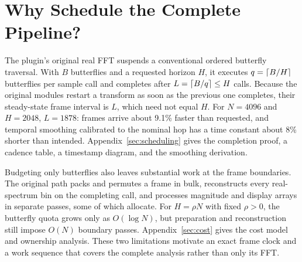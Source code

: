 \section{Why Schedule the Complete Pipeline?}
\label{sec:legacy-motivation}
The plugin's original real FFT suspends a conventional ordered butterfly
traversal. With $B$ butterflies and a requested horizon $H$, it executes
$q=\left\lceil B/H\right\rceil$ butterflies per sample call and completes after
$L=\left\lceil B/q\right\rceil\le H$ calls. Because the original modules restart a transform as
soon as the previous one completes, their steady-state frame interval is $L$,
which need not equal $H$. For $N=4096$ and $H=2048$, $L=1878$: frames arrive
about 9.1\% faster than requested, and temporal smoothing calibrated to the
nominal hop has a time constant about 8\% shorter than intended.
Appendix~\ref{sec:scheduling} gives the completion proof, a cadence table, a
timestamp diagram, and the smoothing derivation.

Budgeting only butterflies also leaves substantial work at the frame
boundaries. The original path packs and permutes a frame in bulk, reconstructs
every real-spectrum bin on the completing call, and processes magnitude and
display arrays in separate passes, some of which allocate. For $H=\rho N$ with
fixed $\rho>0$, the butterfly quota grows only as $O(\log N)$, but preparation
and reconstruction still impose $O(N)$ boundary passes.
Appendix~\ref{sec:cost} gives the cost model and ownership analysis. These two
limitations motivate an exact frame clock and a work sequence that covers the
complete analysis rather than only its FFT.
